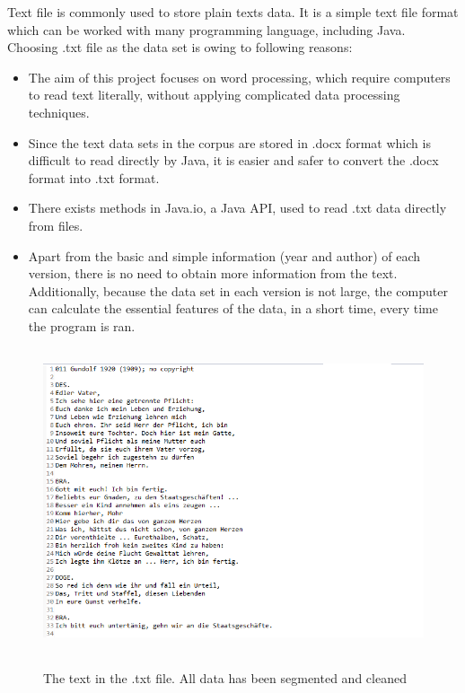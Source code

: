 Text file is commonly used to store plain texts data. It is a simple text file format which can be worked with many programming language, including Java. Choosing .txt file as the data set is owing to following reasons:

\begin{itemize}
	\item \textbf{} The aim of this project focuses on word processing, which require computers to read text literally, without applying complicated data processing techniques.
	\item \textbf{} Since the text data sets in the corpus are stored in .docx format which is difficult to read directly by Java, it is easier and safer to convert the .docx format into .txt format.
	\item \textbf{} There exists methods in Java.io, a Java API, used to read .txt data directly from files.
	\item \textbf{} Apart from the basic and simple information (year and author) of each version, there is no need to obtain more information from the text. Additionally, because the data set in each version is not large, the computer can calculate the essential features of the data, in a short time, every time the program is ran. 
\end{itemize}
\begin{figure}[h]
	\centering	
	\includegraphics[width=13cm, height=9cm]{Figs/Data-example}\\[1ex]
	\caption{The text in the .txt file. All data has been segmented and cleaned}
	\label{fig:dataExample}
\end{figure}





